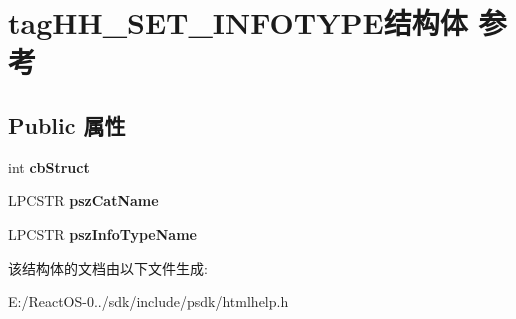 \hypertarget{structtag_h_h___s_e_t___i_n_f_o_t_y_p_e}{}\section{tag\+H\+H\+\_\+\+S\+E\+T\+\_\+\+I\+N\+F\+O\+T\+Y\+P\+E结构体 参考}
\label{structtag_h_h___s_e_t___i_n_f_o_t_y_p_e}
\subsection*{Public 属性}
\begin{DoxyCompactItemize}
\item 
\mbox{\label{structtag_h_h___s_e_t___i_n_f_o_t_y_p_e_a312952b08d30e17d7572458b4beae0ed}} 
int {\bfseries cb\+Struct}
\item 
\mbox{\label{structtag_h_h___s_e_t___i_n_f_o_t_y_p_e_a6fee14b9381f0e43e38dabad2fb0920f}} 
L\+P\+C\+S\+TR {\bfseries psz\+Cat\+Name}
\item 
\mbox{\label{structtag_h_h___s_e_t___i_n_f_o_t_y_p_e_adfc0378adcdb34a78388d25a52ddbd87}} 
L\+P\+C\+S\+TR {\bfseries psz\+Info\+Type\+Name}
\end{DoxyCompactItemize}


该结构体的文档由以下文件生成\+:\begin{DoxyCompactItemize}
\item 
E\+:/\+React\+O\+S-\/0../sdk/include/psdk/htmlhelp.\+h\end{DoxyCompactItemize}
